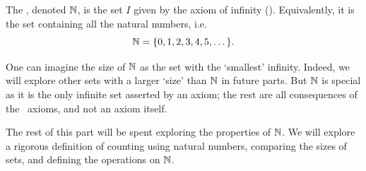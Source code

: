 \begin{definition}
    The , denoted $\mathbb{N}$, is the set $I$ given by the axiom of infinity (). Equivalently, it is the set containing all the natural numbers, i.e.
    \[
        \mathbb{N} = \{0, 1, 2, 3, 4, 5, \dots\}.
    \]
\end{definition}

One can imagine the size of $\mathbb{N}$ as the set with the `smallest' infinity. Indeed, we will explore other sets with a larger `size' than $\mathbb{N}$ in future parts. But $\mathbb{N}$ is special as it is the only infinite set asserted by an axiom; the rest are all consequences of the \ZFC~axioms, and not an axiom itself.

The rest of this part will be spent exploring the properties of $\mathbb{N}$. We will explore a rigorous definition of counting using natural numbers, comparing the sizes of sets, and defining the operations on $\mathbb{N}$.
